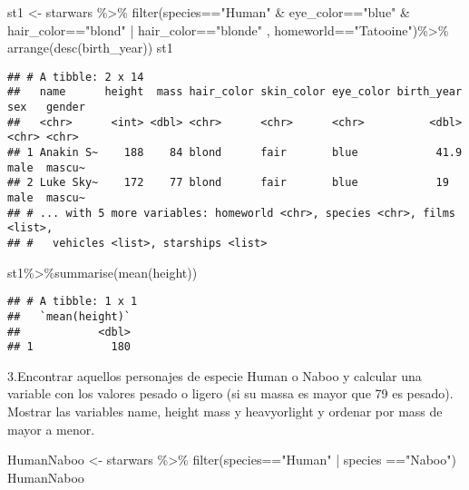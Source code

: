 \documentclass[
]{book}
\newenvironment{Shaded}{\begin{snugshade}}{\end{snugshade}}
\newcommand{\FunctionTok}[1]{\textcolor[rgb]{0.00,0.00,0.00}{#1}}
\newcommand{\NormalTok}[1]{#1}
\newcommand{\OtherTok}[1]{\textcolor[rgb]{0.56,0.35,0.01}{#1}}
\newcommand{\SpecialCharTok}[1]{\textcolor[rgb]{0.00,0.00,0.00}{#1}}
\newcommand{\StringTok}[1]{\textcolor[rgb]{0.31,0.60,0.02}{#1}}
\begin{document}
\begin{Shaded}
\begin{Highlighting}[]
\NormalTok{st1 }\OtherTok{\textless{}{-}}\NormalTok{ starwars }\SpecialCharTok{\%\textgreater{}\%}
  \FunctionTok{filter}\NormalTok{(species}\SpecialCharTok{==}\StringTok{"Human"} \SpecialCharTok{\&}\NormalTok{ eye\_color}\SpecialCharTok{==}\StringTok{"blue"} \SpecialCharTok{\&}\NormalTok{ hair\_color}\SpecialCharTok{==}\StringTok{"blond"} \SpecialCharTok{|}\NormalTok{ hair\_color}\SpecialCharTok{==}\StringTok{"blonde"}\NormalTok{ , homeworld}\SpecialCharTok{==}\StringTok{"Tatooine"}\NormalTok{)}\SpecialCharTok{\%\textgreater{}\%}
  \FunctionTok{arrange}\NormalTok{(}\FunctionTok{desc}\NormalTok{(birth\_year))}
\NormalTok{st1}
\end{Highlighting}
\end{Shaded}

\begin{verbatim}
## # A tibble: 2 x 14
##   name      height  mass hair_color skin_color eye_color birth_year sex   gender
##   <chr>      <int> <dbl> <chr>      <chr>      <chr>          <dbl> <chr> <chr> 
## 1 Anakin S~    188    84 blond      fair       blue            41.9 male  mascu~
## 2 Luke Sky~    172    77 blond      fair       blue            19   male  mascu~
## # ... with 5 more variables: homeworld <chr>, species <chr>, films <list>,
## #   vehicles <list>, starships <list>
\end{verbatim}

\begin{Shaded}
\begin{Highlighting}[]
\NormalTok{st1}\SpecialCharTok{\%\textgreater{}\%}\FunctionTok{summarise}\NormalTok{(}\FunctionTok{mean}\NormalTok{(height))}
\end{Highlighting}
\end{Shaded}

\begin{verbatim}
## # A tibble: 1 x 1
##   `mean(height)`
##            <dbl>
## 1            180
\end{verbatim}

3.Encontrar aquellos personajes de especie Human o Naboo y calcular una variable con los valores pesado o ligero (si su massa es mayor que 79 es pesado). Mostrar las variables name, height mass y heavyorlight y ordenar por mass de mayor a menor.

\begin{Shaded}
\begin{Highlighting}[]
\NormalTok{HumanNaboo }\OtherTok{\textless{}{-}}\NormalTok{ starwars }\SpecialCharTok{\%\textgreater{}\%}
  \FunctionTok{filter}\NormalTok{(species}\SpecialCharTok{==}\StringTok{"Human"} \SpecialCharTok{|}\NormalTok{ species }\SpecialCharTok{==}\StringTok{"Naboo"}\NormalTok{)}
\NormalTok{HumanNaboo}
\end{Highlighting}
\end{Shaded}
\end{document}
